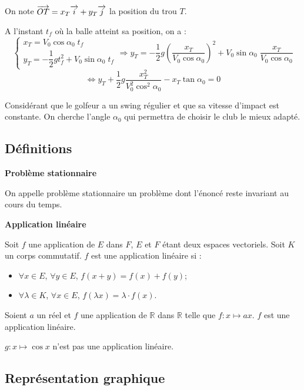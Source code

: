 \documentclass[10pt]{article}
\begin{document}
On note $\overrightarrow{OT}=x_T\overrightarrow{i} + y_T\overrightarrow{j}$ la position du trou $T$. 

A l'instant $t_f$ où la balle atteint sa position, on a : 
$$
\left\{ 
\begin{array}{l}
x_T = V_0 \cos\alpha_0 \; t_f \\ 
y_T = -\dfrac{1}{2}gt_f^2 +  V_0 \sin\alpha_0 \; t_f
\end{array}
\right.
\Longrightarrow 
y_T = -\dfrac{1}{2}g \left(\dfrac{x_T}{V_0 \cos\alpha_0}\right) ^2 + V_0 \sin\alpha_0 \; \dfrac{x_T}{V_0 \cos\alpha_0}
$$
$$
\Longleftrightarrow 
y_T+\dfrac{1}{2}g \dfrac{x_T^2}{V_0^2 \cos^2\alpha_0} - x_T \tan\alpha_0 = 0
$$

Considérant que le golfeur a un swing régulier et que sa vitesse d'impact est constante. On cherche l'angle $\alpha_0$ qui permettra de choisir le club le mieux adapté.

\subsection{Définitions}

\begin{defi}
\textbf{Problème stationnaire}

On appelle problème stationnaire un problème dont l'énoncé reste invariant au cours du temps.
\end{defi}


\begin{defi}
\textbf{Application linéaire}

Soit $f$ une application de $E$ dans $F$, $E$ et $F$ étant deux espaces vectoriels. Soit $K$ un corps commutatif. $f$ est une application linéaire si :
\begin{itemize}
\item $\forall x \in E$, $\forall y \in E$, $f(x+y)=f(x)+f(y)$;
\item $\forall \lambda \in K$, $\forall x \in E$, $f(\lambda x) =\lambda \cdot f(x)$.
\end{itemize}
\end{defi}

\begin{exemple}
Soient $a$ un réel et $f$ une application de $\mathbb{R}$ dans $\mathbb{R}$ telle que $f:x\mapsto ax $. $f$ est une application linéaire.

$g:x\mapsto \cos x$ n'est pas une application linéaire.

\end{exemple}

\subsection{Représentation graphique}
\end{document}
